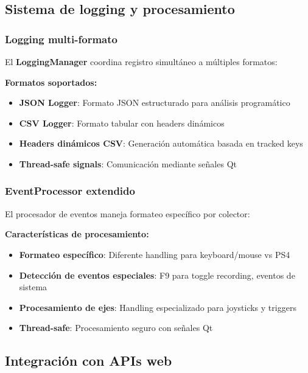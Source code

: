 \subsection{Sistema de logging y procesamiento}
\label{subsec:logging_procesamiento_input}

\subsubsection{Logging multi-formato}

El \textbf{LoggingManager} coordina registro simultáneo a múltiples formatos:

\textbf{Formatos soportados:}
\begin{itemize}
    \item \textbf{JSON Logger}: Formato JSON estructurado para análisis programático
    \item \textbf{CSV Logger}: Formato tabular con headers dinámicos
    \item \textbf{Headers dinámicos CSV}: Generación automática basada en tracked keys
    \item \textbf{Thread-safe signals}: Comunicación mediante señales Qt
\end{itemize}

\subsubsection{EventProcessor extendido}

El procesador de eventos maneja formateo específico por colector:

\textbf{Características de procesamiento:}
\begin{itemize}
    \item \textbf{Formateo específico}: Diferente handling para keyboard/mouse vs PS4
    \item \textbf{Detección de eventos especiales}: F9 para toggle recording, eventos de sistema
    \item \textbf{Procesamiento de ejes}: Handling especializado para joysticks y triggers
    \item \textbf{Thread-safe}: Procesamiento seguro con señales Qt
\end{itemize}

\subsection{Integración con APIs web}
\label{subsec:integracion_api_input}


